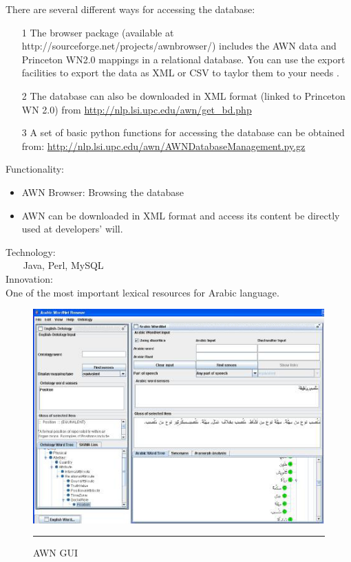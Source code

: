 There are several different ways for accessing the database:\\
\begin{itemize}
\item[1] The browser package (available at http://sourceforge.net/projects/awnbrowser/) includes the AWN data and Princeton WN2.0 mappings in a relational database. You can use the export facilities to export the data as XML or CSV to taylor them to your needs .\\
\item[2] The database can also be downloaded in XML format (linked to Princeton WN 2.0) from \url {http://nlp.lsi.upc.edu/awn/get_bd.php}\\
\item[3] A set of basic python functions for accessing the database can be obtained from: \url {http://nlp.lsi.upc.edu/awn/AWNDatabaseManagement.py.gz}\\
\end{itemize}
Functionality:\\
\begin{itemize}
\item AWN Browser: Browsing the database\\
\item AWN can be downloaded in XML format and access its content be directly used at developers' will.\\
\end{itemize}
Technology:\\
    Java, Perl, MySQL\\
Innovation:\\
	One of the most important lexical resources for Arabic language.\\
\begin{figure}[htbp]
	\begin{center}
		\includegraphics{./Figures/AWNGUI.png}
		\rule{20em}{0.5pt}
	\end{center}
	\caption[AWN GUI]{AWN GUI}
	\label{fig:AWN GUI}
\end{figure}
